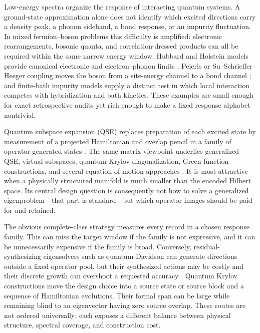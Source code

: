 \documentclass[
  reprint,
  amsmath,
  amssymb,
  aps,
  pra,
  nofootinbib,
  superscriptaddress,
  floatfix
]{revtex4-2}
\begin{document}
Low-energy spectra organize the response of interacting quantum systems.  A
ground-state approximation alone does not identify which excited directions
carry a density peak, a phonon sideband, a bond response, or an impurity
fluctuation.  In mixed fermion--boson problems this difficulty is amplified:
electronic rearrangements, bosonic quanta, and correlation-dressed products
can all be required within the same narrow energy window.  Hubbard and
Holstein models provide canonical electronic and electron--phonon limits
\cite{Hubbard1963,Holstein1959}; Peierls or Su--Schrieffer--Heeger coupling
moves the boson from a site-energy channel to a bond channel
\cite{SuSchriefferHeeger1979}; and finite-bath impurity models supply a
distinct test in which local interaction competes with hybridization and bath
kinetics.  These examples are small enough for exact retrospective audits yet
rich enough to make a fixed response alphabet nontrivial.

Quantum subspace expansion (QSE) replaces preparation of each excited state
by measurement of a projected Hamiltonian and overlap pencil in a family of
operator-generated states \cite{McClean2017QSE,Colless2018QSE}.  The same
matrix viewpoint underlies generalized QSE, virtual subspaces, quantum
Krylov diagonalization, Green-function constructions, and several
equation-of-motion approaches
\cite{Urbanek2020VQSE,Yoshioka2022GQSE,CortesGray2022QKSD,
Motta2024SubspaceReview,Jamet2022GreenQSE,Ollitrault2020qEOM}.  It is most
attractive when a physically structured manifold is much smaller than the
encoded Hilbert space.  Its central design question is consequently not how
to solve a generalized eigenproblem---that part is standard---but which
operator images should be paid for and retained.

The obvious complete-class strategy measures every record in a chosen
response family.  This can miss the target window if the family is not
expressive, and it can be unnecessarily expensive if the family is broad.
Conversely, residual-synthesizing eigensolvers such as quantum Davidson can
generate directions outside a fixed operator pool, but their synthesized
actions may be costly and their discrete growth can overshoot a requested
accuracy \cite{Tkachenko2024QDavidson}.  Quantum Krylov constructions move
the design choice into a source state or source block and a sequence of
Hamiltonian evolutions.  Their formal span can be large while remaining
blind to an eigenvector having zero source overlap.  These routes are not
ordered universally; each exposes a different balance between physical
structure, spectral coverage, and construction cost.
\end{document}

